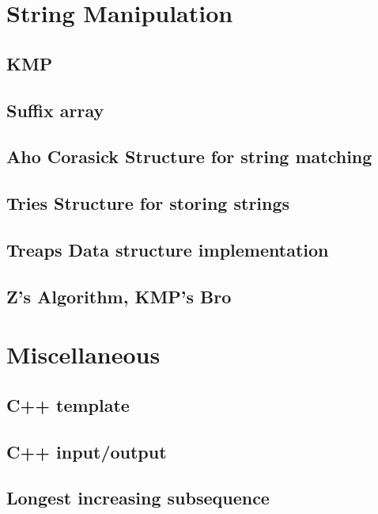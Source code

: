 \section{String Manipulation}
\subsection{KMP}
\raggedbottom
\hrulefill
\subsection{Suffix array}
\raggedbottom
\hrulefill
\subsection{Aho Corasick Structure for string matching}
\raggedbottom
\hrulefill
\subsection{Tries Structure for storing strings}
\raggedbottom
\hrulefill
\subsection{Treaps Data structure implementation}
\raggedbottom
\hrulefill
\subsection{Z's Algorithm, KMP's Bro}
\raggedbottom
\hrulefill

\section{Miscellaneous}
\subsection{C++ template}
\raggedbottom
\hrulefill
\subsection{C++ input/output}
\raggedbottom
\hrulefill
\subsection{Longest increasing subsequence}
\raggedbottom
\hrulefill
